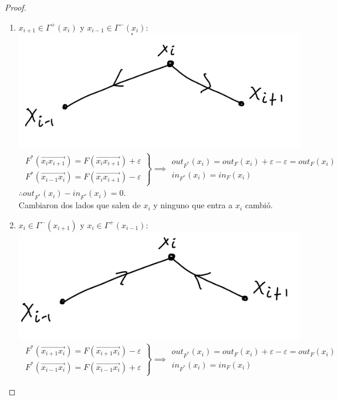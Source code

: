 \begin{proof}
\begin{enumerate}
\item $x_{i+1} \in \Gamma^+(x_i)$ y $x_{i-1} \in \Gamma^{-}(x_{i})$: \includegraphics[scale=0.4]{img/backward-forward.png}\\
\begin{align}
    \left.
    \begin{array}{cc}
    F^*(\overrightarrow{x_i x_{i+1}}) = F(\overrightarrow{x_i x_{i+1}}) + \varepsilon\\
    F^*(\overrightarrow{x_{i-1} x_i}) = F(\overrightarrow{x_i x_{i+1}}) - \varepsilon 
    \end{array}
     \right\} \implies
     \begin{array}{cc}
    out_{F^*}(x_i) = out_F(x_i) + \varepsilon -  \varepsilon = out_F(x_i)\\
    in_{F^*} (x_i) = in_F(x_i)
    \end{array}
\end{align}
$\therefore out_{F^*} (x_i) - in_{F^*}(x_i) = 0.$\\
Cambiaron dos lados que salen de $x_i$ y ninguno que entra a $x_i$ cambió.

\item $x_i \in \Gamma^-(x_{i+1})$ y $x_i\in \Gamma^+(x_{i-1}):$ \includegraphics[scale=0.4]{img/forward-backward.png}\\
\begin{align}
    \left.
    \begin{array}{cc}
    F^*(\overrightarrow{x_{i+1} x_i}) = F(\overrightarrow{x_{i+1} x_i}) - \varepsilon\\
    F^*(\overrightarrow{x_{i-1} x_i}) = F(\overrightarrow{x_{i-1} x_i}) + \varepsilon 
    \end{array}
     \right\} \implies
     \begin{array}{cc}
    out_{F^*}(x_i) = out_F(x_i) + \varepsilon -  \varepsilon = out_F(x_i)\\
    in_{F^*} (x_i) = in_F(x_i)
    \end{array}
\end{align}


\end{enumerate}
\end{proof}

